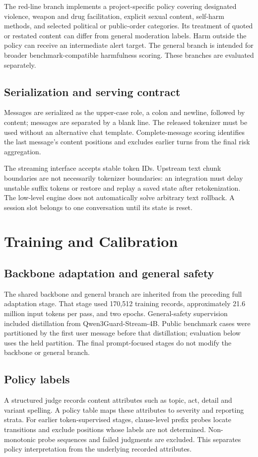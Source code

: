 \documentclass[11pt]{article}
\begin{document}
The red-line branch implements a project-specific policy covering designated violence, weapon and drug facilitation, explicit sexual content, self-harm methods, and selected political or public-order categories. Its treatment of quoted or restated content can differ from general moderation labels. Harm outside the policy can receive an intermediate alert target. The general branch is intended for broader benchmark-compatible harmfulness scoring. These branches are evaluated separately.

\subsection{Serialization and serving contract}
Messages are serialized as the upper-case role, a colon and newline, followed by content; messages are separated by a blank line. The released tokenizer must be used without an alternative chat template. Complete-message scoring identifies the last message's content positions and excludes earlier turns from the final risk aggregation.

The streaming interface accepts stable token IDs. Upstream text chunk boundaries are not necessarily tokenizer boundaries: an integration must delay unstable suffix tokens or restore and replay a saved state after retokenization. The low-level engine does not automatically solve arbitrary text rollback. A session slot belongs to one conversation until its state is reset.

\section{Training and Calibration}
\subsection{Backbone adaptation and general safety}
The shared backbone and general branch are inherited from the preceding full adaptation stage. That stage used 170,512 training records, approximately 21.6 million input tokens per pass, and two epochs. General-safety supervision included distillation from Qwen3Guard-Stream-4B. Public benchmark cases were partitioned by the first user message before that distillation; evaluation below uses the held partition. The final prompt-focused stages do not modify the backbone or general branch.

\subsection{Policy labels}
A structured judge records content attributes such as topic, act, detail and variant spelling. A policy table maps these attributes to severity and reporting strata. For earlier token-supervised stages, clause-level prefix probes locate transitions and exclude positions whose labels are not determined. Non-monotonic probe sequences and failed judgments are excluded. This separates policy interpretation from the underlying recorded attributes.
\end{document}
